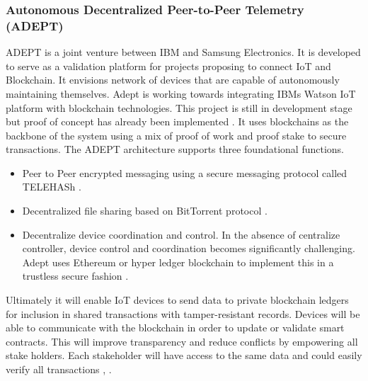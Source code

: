 \subsubsection{Autonomous Decentralized Peer-to-Peer Telemetry (ADEPT)} \label{Adept}
ADEPT is a joint venture between IBM and Samsung Electronics. It is developed to serve as a validation platform for projects proposing to connect IoT and Blockchain. It envisions network of devices that are capable of autonomously maintaining themselves. Adept is working towards integrating IBMs Watson IoT platform with blockchain technologies. This project is still in development stage but proof of concept has already been implemented \cite{misc:005}. It uses blockchains as the backbone of the system using a mix of proof of work and proof stake to secure transactions. The ADEPT architecture supports three foundational functions.
\begin{itemize}
  \item Peer to Peer encrypted messaging using a secure messaging protocol called TELEHASh \cite{misc:005}.
  \item Decentralized file sharing based on BitTorrent protocol \cite{misc:005}.
\item Decentralize device coordination and control.
In the absence of centralize controller, device control and coordination becomes significantly challenging. Adept uses Ethereum or hyper ledger blockchain to implement this in a trustless secure fashion \cite{misc:005}.

\end{itemize}
Ultimately it will enable IoT devices to send data to private blockchain ledgers for inclusion in shared transactions with tamper-resistant records. Devices will be able to communicate with the blockchain in order to update or validate smart contracts. This will improve transparency and reduce conflicts by empowering all stake holders. Each stakeholder will have access to the same data and could easily verify all transactions \cite{misc:005}, \cite{misc:004}. 
\vspace{0.5cm}  
